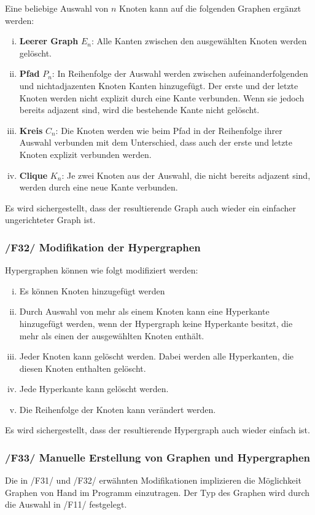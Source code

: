 \documentclass{article}
\begin{document}
	Eine beliebige Auswahl von $n$ Knoten kann auf die folgenden Graphen ergänzt werden:
	\begin{enumerate}[i)]
		\item{\textbf{Leerer Graph} $E_n$: Alle Kanten zwischen den ausgewählten Knoten werden gelöscht.}
		\item{\textbf{Pfad} $P_n$: In Reihenfolge der Auswahl werden zwischen aufeinanderfolgenden und nichtadjazenten Knoten Kanten hinzugefügt. Der erste und der letzte Knoten werden nicht explizit durch eine Kante verbunden. Wenn sie jedoch bereits adjazent sind, wird die bestehende Kante nicht gelöscht.}
		\item{\textbf{Kreis} $C_n$: Die Knoten werden wie beim Pfad in der Reihenfolge ihrer Auswahl verbunden mit dem Unterschied, dass auch der erste und letzte Knoten explizit verbunden werden.}
		\item{\textbf{Clique} $K_n$: Je zwei Knoten aus der Auswahl, die nicht bereits adjazent sind, werden durch eine neue Kante verbunden.}
	\end{enumerate}
	Es wird sichergestellt, dass der resultierende Graph auch wieder ein einfacher ungerichteter Graph ist.
	
	\subsubsection*{/F32/ Modifikation der Hypergraphen} \label{f32} 
	Hypergraphen können wie folgt modifiziert werden:
	\begin{enumerate}[i)]
		\item{Es können Knoten hinzugefügt werden}
		\item{Durch Auswahl von mehr als einem Knoten kann eine Hyperkante hinzugefügt werden, wenn der Hypergraph keine Hyperkante besitzt, die mehr als einen der ausgewählten Knoten enthält.}
		\item{Jeder Knoten kann gelöscht werden. Dabei werden alle Hyperkanten, die diesen Knoten enthalten gelöscht.}
		\item{Jede Hyperkante kann gelöscht werden.}
		\item{Die Reihenfolge der Knoten kann verändert werden.}
	\end{enumerate}
	Es wird sichergestellt, dass der resultierende Hypergraph auch wieder einfach ist.
	
	\subsubsection*{/F33/ Manuelle Erstellung von Graphen und Hypergraphen} \label{f33} 
	Die in /F31/ und /F32/ erwähnten Modifikationen implizieren die Möglichkeit Graphen von Hand im Programm einzutragen. Der Typ des Graphen wird durch die Auswahl in /F11/ festgelegt.
	\newpage
	
\end{document}
